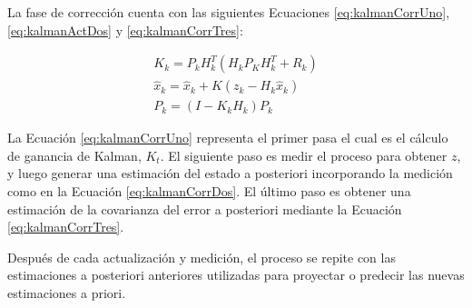 La fase de corrección cuenta con las siguientes Ecuaciones \ref{eq:kalmanCorrUno}, \ref{eq:kalmanActDos} y \ref{eq:kalmanCorrTres}:

\begin{eqnarray}
\label{eq:kalmanCorrUno}
K_k = P_kH^{T}_k(H_kP_KH^{T}_k + R_k)\\
\label{eq:kalmanCorrDos}
\hat{x}_k = \hat{x}_k + K(z_k - H_k \hat{x}_k)\\
\label{eq:kalmanCorrTres}
P_k = (I - K_kH_k)P_k
\end{eqnarray}

La Ecuación \ref{eq:kalmanCorrUno} representa el primer pasa el cual es el cálculo de ganancia de Kalman, $K_t$. El siguiente paso es medir el proceso para obtener $z$, y luego generar una estimación del estado a posteriori incorporando la medición como en la Ecuación \ref{eq:kalmanCorrDos}. El último paso es obtener una estimación de la covarianza del error a posteriori mediante la Ecuación \ref{eq:kalmanCorrTres}.

Después de cada actualización y medición, el proceso se repite con las estimaciones a posteriori anteriores utilizadas para proyectar o predecir las nuevas estimaciones a priori.

